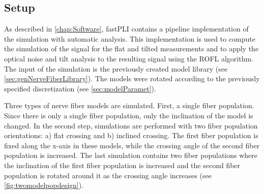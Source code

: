 \subsection{Setup}
\label{sec:simParameterEnv}
%
%
As described in \cref{chap:Software}, \ac{fastPLI} contains a pipeline implementation of the simulation with automatic analysis.
This implementation is used to compute the simulation of the signal for the flat and tilted measurements and to apply the optical noise and tilt analysis to the resulting signal using the \ac{ROFL} algorithm.
The input of the simulation is the previously created model library (see \cref{sec:genNerveFiberLibrary}).
The models were rotated according to the previously specified discretization (see \cref{sec:modelParamet}).
\par
%
Three types of nerve fiber models are simulated.
First, a single fiber population.
Since there is only a single fiber population, only the inclination of the model is changed.
In the second step, simulations are performed with two fiber population orientations: a) flat crossing and b) inclined crossing.
The first fiber population is fixed along the x-axis in these models, while the crossing angle of the second fiber population is increased.
The last simulation contains two fiber populations where the inclination of the first fiber population is increased and the second fiber population is rotated around it as the crossing angle increases (see \cref{fig:twomodelpopdesign}).
\par
%
